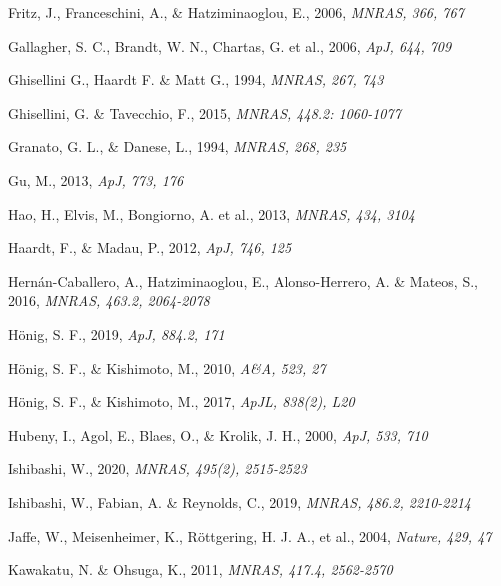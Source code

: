 \documentclass[]{aa}
\begin{document}
\begin{thebibliography}{}
Fritz, J., Franceschini, A., \& Hatziminaoglou, E., 2006,
\newblock \emph{MNRAS, 366, 767}

Gallagher, S. C., Brandt, W. N., Chartas, G. et al., 2006, 
\newblock \emph{ApJ, 644, 709}

Ghisellini G., Haardt F. \& Matt G., 1994,
\newblock \emph{MNRAS, 267, 743}

Ghisellini, G. \& Tavecchio, F., 2015,
\newblock \emph{MNRAS, 448.2: 1060-1077}

Granato, G. L., \& Danese, L., 1994, 
\newblock \emph{MNRAS, 268, 235}

Gu, M., 2013,
\newblock \emph{ApJ, 773, 176}

Hao, H., Elvis, M., Bongiorno, A. et al., 2013,
\newblock \emph{MNRAS, 434, 3104}

Haardt, F., \& Madau, P., 2012,
\newblock \emph{ApJ, 746, 125}

Hernán-Caballero, A., Hatziminaoglou, E., Alonso-Herrero,  A. \& Mateos, S., 2016,
\newblock \emph{MNRAS, 463.2, 2064-2078}

H\"{o}nig, S. F., 2019,
\newblock \emph{ApJ, 884.2, 171}

H\"{o}nig, S. F., \& Kishimoto, M., 2010,
\newblock \emph{A\&A, 523, 27}

H\"{o}nig, S. F., \& Kishimoto, M., 2017,
\newblock \emph{ApJL, 838(2), L20}

Hubeny, I., Agol, E., Blaes, O., \& Krolik, J. H., 2000,
\newblock \emph{ApJ, 533, 710}

Ishibashi, W., 2020,
\newblock \emph{MNRAS, 495(2), 2515-2523}

Ishibashi, W., Fabian, A. \& Reynolds, C., 2019,
\newblock \emph{MNRAS, 486.2, 2210-2214}

Jaffe, W., Meisenheimer, K., Röttgering, H. J. A., et al., 2004,
\newblock \emph{Nature, 429, 47}

Kawakatu, N. \& Ohsuga, K., 2011,
\newblock \emph{MNRAS, 417.4, 2562-2570}


\end{thebibliography}
\end{document}
